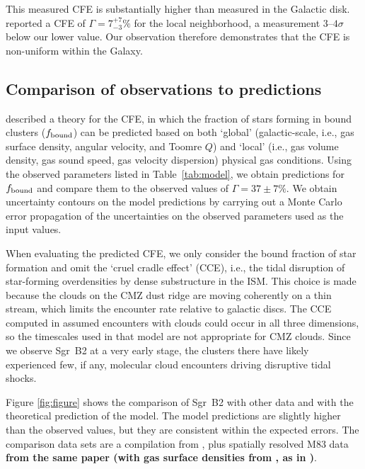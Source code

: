 \documentclass[twocolumn]{aastex62}
\def\referee#1{\textbf{#1}}
\begin{document}
This measured CFE is substantially higher than measured in the Galactic disk.
\citet{Lada2003a} reported a CFE of $\Gamma=7^{+7}_{-3}\%$ for the local neighborhood, a
measurement $3$--$4\sigma$ below our lower value.  Our observation therefore demonstrates
that the CFE is non-uniform within the Galaxy.

\subsection{Comparison of observations to predictions}
\citet{Kruijssen2012a} described a theory for the CFE, in which the fraction
of stars forming in bound clusters ($f_{\rm bound}$) can be predicted based on both
`global' (galactic-scale, i.e., gas surface density, angular velocity, and
Toomre $Q$) and `local' (i.e., gas volume density, gas sound speed, gas
velocity dispersion) physical gas conditions. Using the observed parameters
listed in Table~\ref{tab:model}, we obtain predictions for $f_{\rm bound}$ and
compare them to the observed values of $\Gamma=37\pm7\%$. We obtain uncertainty
contours on the model predictions by carrying out a Monte Carlo error
propagation of the uncertainties on the observed parameters used as the input
values.

When evaluating the predicted CFE, we only consider the bound fraction of star formation
and omit the `cruel cradle effect' (CCE), i.e., the tidal disruption of
star-forming overdensities by dense substructure in the ISM. This choice is
made because the clouds on the CMZ dust ridge are moving coherently on a thin
stream, which limits the encounter rate relative to galactic discs.  The CCE
computed in \citet{Kruijssen2012a} assumed encounters with clouds could occur
in all three dimensions, so the timescales used in that model are not
appropriate for CMZ clouds.  Since we observe Sgr~B2 at a very early stage, the
clusters there have likely experienced few, if any, molecular cloud encounters
driving disruptive tidal shocks.

Figure \ref{fig:figure} shows the comparison of Sgr~B2 with other data and with
the theoretical prediction of the \citet{Kruijssen2012a} model. The model
predictions are slightly higher than the observed values, but they are
consistent within the expected errors. The comparison data sets are a
compilation from \citet{Adamo2015a}, plus spatially resolved M83 data
\referee{from the same paper (with gas surface densities from
\citealt{Freeman2017a}, as in \citealt{Reina-Campos2017a})}.
\end{document}
